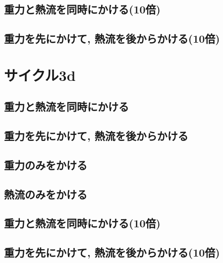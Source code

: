 

\subsection{重力と熱流を同時にかける(10倍)}



\subsection{重力を先にかけて, 熱流を後からかける(10倍)}



\section{サイクル3d}

\subsection{重力と熱流を同時にかける}



\subsection{重力を先にかけて, 熱流を後からかける}



\subsection{重力のみをかける}



\subsection{熱流のみをかける}



\subsection{重力と熱流を同時にかける(10倍)}



\subsection{重力を先にかけて, 熱流を後からかける(10倍)}

